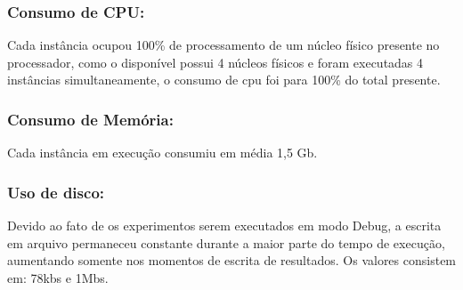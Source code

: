 \subsubsection{Consumo de CPU:}
Cada instância ocupou 100\% de processamento de um núcleo físico presente no processador, como o disponível possui 4 núcleos físicos e foram executadas 4 instâncias simultaneamente, o consumo de cpu foi para 100\% do total presente.

\subsubsection{Consumo de Memória:}
Cada instância em execução consumiu em média 1,5 Gb.

\subsubsection{Uso de disco:}
Devido ao fato de os experimentos serem executados em modo Debug, a escrita em arquivo permaneceu constante durante a maior parte do tempo de execução, aumentando somente nos momentos de escrita de resultados.
Os valores consistem em: 78kbs e 1Mbs.